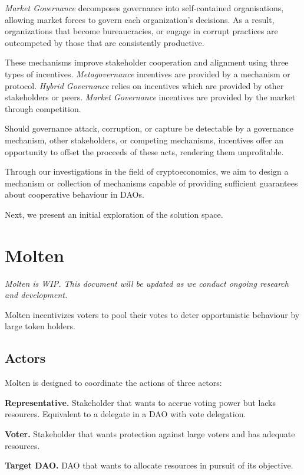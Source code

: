 \documentclass[
]{article}
\begin{document}
\emph{Market Governance} decomposes governance into self-contained
organisations, allowing market forces to govern each organization's
decisions. As a result, organizations that become bureaucracies, or
engage in corrupt practices are outcompeted by those that are
consistently productive.

These mechanisms improve stakeholder cooperation and alignment using
three types of incentives. \emph{Metagovernance} incentives are provided
by a mechanism or protocol. \emph{Hybrid Governance} relies on
incentives which are provided by other stakeholders or peers.
\emph{Market Governance} incentives are provided by the market through
competition.

Should governance attack, corruption, or capture be detectable by a
governance mechanism, other stakeholders, or competing mechanisms,
incentives offer an opportunity to offset the proceeds of these acts,
rendering them unprofitable.

Through our investigations in the field of cryptoeconomics, we aim to
design a mechanism or collection of mechanisms capable of providing
sufficient guarantees about cooperative behaviour in DAOs.

Next, we present an initial exploration of the solution space.
\hypertarget{molten}{%
\section{Molten}\label{molten}}

\emph{Molten is WIP. This document will be updated as we conduct ongoing
research and development.}

Molten incentivizes voters to pool their votes to deter opportunistic
behaviour by large token holders.

\hypertarget{actors}{%
\subsection{Actors}\label{actors}}

Molten is designed to coordinate the actions of three actors:

\textbf{Representative.} Stakeholder that wants to accrue voting power
but lacks resources. Equivalent to a delegate in a DAO with vote
delegation.

\textbf{Voter.} Stakeholder that wants protection against large voters
and has adequate resources.

\textbf{Target DAO.} DAO that wants to allocate resources in pursuit of
its objective.
\end{document}
